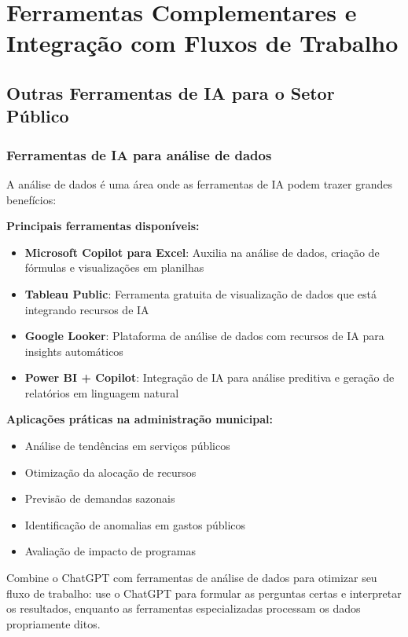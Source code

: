 \documentclass[12pt,a4paper]{book}
\begin{document}
\chapter{Ferramentas Complementares e Integração com Fluxos de Trabalho}

\section{Outras Ferramentas de IA para o Setor Público}

\subsection{Ferramentas de IA para análise de dados}

A análise de dados é uma área onde as ferramentas de IA podem trazer grandes benefícios:

\textbf{Principais ferramentas disponíveis:}
\begin{itemize}
    \item \textbf{Microsoft Copilot para Excel}: Auxilia na análise de dados, criação de fórmulas e visualizações em planilhas
    \item \textbf{Tableau Public}: Ferramenta gratuita de visualização de dados que está integrando recursos de IA
    \item \textbf{Google Looker}: Plataforma de análise de dados com recursos de IA para insights automáticos
    \item \textbf{Power BI + Copilot}: Integração de IA para análise preditiva e geração de relatórios em linguagem natural
\end{itemize}

\textbf{Aplicações práticas na administração municipal:}
\begin{itemize}
    \item Análise de tendências em serviços públicos
    \item Otimização da alocação de recursos
    \item Previsão de demandas sazonais
    \item Identificação de anomalias em gastos públicos
    \item Avaliação de impacto de programas
\end{itemize}

\begin{tcolorbox}[dica]
Combine o ChatGPT com ferramentas de análise de dados para otimizar seu fluxo de trabalho: use o ChatGPT para formular as perguntas certas e interpretar os resultados, enquanto as ferramentas especializadas processam os dados propriamente ditos.
\end{tcolorbox}
\end{document}
